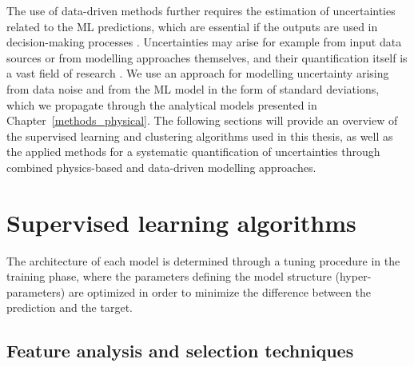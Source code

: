 The use of data-driven methods further requires the estimation of uncertainties related to the ML predictions, which are essential if the outputs are used in decision-making processes \cite{knusel_argument-based_2020}. 
Uncertainties may arise for example from input data sources or from modelling approaches themselves, and their quantification itself is a vast field of research \cite{willard_integrating_2020,knusel_argument-based_2020}.
We use an approach for modelling uncertainty arising from data noise and from the ML model in the form of standard deviations, which we propagate through the analytical models presented in Chapter~\ref{methods_physical}. 
The following sections will provide an overview of the supervised learning and clustering algorithms used in this thesis, as well as the applied methods for a systematic quantification of uncertainties through combined physics-based and data-driven modelling approaches.

\section{Supervised learning algorithms}
\label{ML_supervised}
The architecture of each model is determined through a tuning procedure in the training phase, where the parameters defining the model structure (hyper-parameters) are optimized in order to minimize the difference between the prediction and the target. 

\subsection{Feature analysis and selection techniques}


